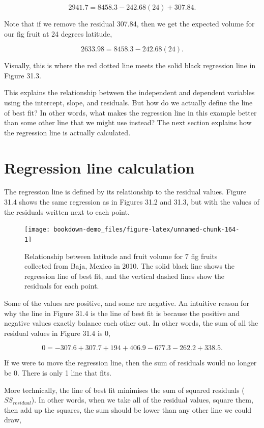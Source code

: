 \documentclass[
]{scrbook}
\begin{document}
\[2941.7 = 8458.3 - 242.68(24) + 307.84.\]

Note that if we remove the residual 307.84, then we get the expected volume for our fig fruit at 24 degrees latitude,

\[2633.98 = 8458.3 - 242.68(24).\]

Visually, this is where the red dotted line meets the solid black regression line in Figure 31.3.

This explains the relationship between the independent and dependent variables using the intercept, slope, and residuals.
But how do we actually define the line of best fit?
In other words, what makes the regression line in this example better than some other line that we might use instead?
The next section explains how the regression line is actually calculated.

\hypertarget{regression-line-calculation}{%
\section{Regression line calculation}\label{regression-line-calculation}}

The regression line is defined by its relationship to the residual values.
Figure 31.4 shows the same regression as in Figures 31.2 and 31.3, but with the values of the residuals written next to each point.

\begin{figure}
\texttt{[image: bookdown-demo\_files/figure-latex/unnamed-chunk-164-1]} \caption{Relationship between latitude and fruit volume for 7 fig fruits collected from Baja, Mexico in 2010. The solid black line shows the regression line of best fit, and the vertical dashed lines show the residuals for each point.}\label{fig:unnamed-chunk-164}
\end{figure}

Some of the values are positive, and some are negative.
An intuitive reason for why the line in Figure 31.4 is the line of best fit is because the positive and negative values exactly balance each other out.
In other words, the sum of all the residual values in Figure 31.4 is 0,

\[0 = -307.6 + 307.7 + 194 + 406.9 - 677.3 - 262.2 + 338.5.\]

If we were to move the regression line, then the sum of residuals would no longer be 0.
There is only 1 line that fits.

More technically, the line of best fit minimises the sum of squared residuals (\(SS_{residual}\)).
In other words, when we take all of the residual values, square them, then add up the squares, the sum should be lower than any other line we could draw,
\end{document}
